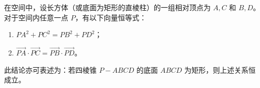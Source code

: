 \begin{statementbox}
在空间中，设长方体（或底面为矩形的直棱柱）的一组相对顶点为 $A, C$ 和 $B, D$。对于空间内任意一点 $P$，有以下向量恒等式：
\begin{enumerate}
    \item $PA^2 + PC^2 = PB^2 + PD^2$；
    \item $\vec{PA} \cdot \vec{PC} = \vec{PB} \cdot \vec{PD}$。
\end{enumerate}
此结论亦可表述为：若四棱锥 $P-ABCD$ 的底面 $ABCD$ 为矩形，则上述关系恒成立。
\end{statementbox}